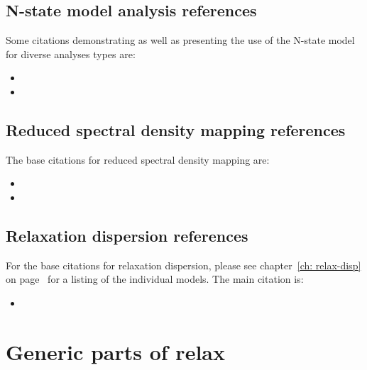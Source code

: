 
\subsection*{N-state model analysis references}

Some citations demonstrating as well as presenting the use of the N-state model for diverse analyses types are:

\begin{itemize}
\item {}
\item {}
\end{itemize}



\subsection*{Reduced spectral density mapping references}

The base citations for reduced spectral density mapping are:

\begin{itemize}
\item {}
\item {}
\end{itemize}



\subsection*{Relaxation dispersion references}

For the base citations for relaxation dispersion, please see chapter~\ref{ch: relax-disp} on page~\pageref{ch: relax-disp} for a listing of the individual models.  The main citation is:

\begin{itemize}
\item {}
\end{itemize}




\section*{Generic parts of relax}

